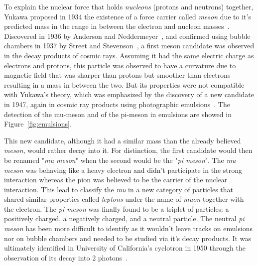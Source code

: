 	To explain the nuclear force that holds \textit{nucleons} (protons and neutrons) together, Yukawa proposed in 1934 the existence of a force carrier called \textit{meson} due to it's predicted mass in the range in between the electron and nucleon masses~\cite{YUKAWA1935}. Discovered in 1936 by Anderson and Neddermeyer~\cite{ANDERSON1936,NEDDERMEYER1937}, and confirmed using bubble chambers in 1937 by Street and Stevenson~\cite{STREET1937}, a first meson candidate was observed in the decay products of cosmic rays. Assuming it had the same electric charge as electrons and protons, this particle was observed to have a curvature due to magnetic field that was sharper than protons but smoother than electrons resulting in a mass in between the two. But its properties were not compatible with Yukawa's theory, which was emphasized by the discovery of a new candidate in 1947, again in cosmic ray products using photographic emulsions~\cite{LATTES1947I,LATTES1947II,LATTES1947III}. The detection of the mu-meson and of the pi-meson in emulsions are showed in Figure~\ref{fig:emulsions}.
	
	This new candidate, although it had a similar mass than the already believed \textit{meson}, would rather decay into it. For distinction, the first candidate would then be renamed "\textit{mu meson}" when the second would be the "\textit{pi meson}". The \textit{mu meson} was behaving like a heavy electron and didn't participate in the strong interaction whereas the pion was believed to be the carrier of the nuclear interaction. This lead to classify the \textit{mu} in a new category of particles  that shared similar properties called \textit{leptons} under the name of \textit{muon} together with the electron. The \textit{pi meson} was finally found to be a triplet of particles: a positively charged, a negatively charged, and a neutral particle. The neutral \textit{pi meson} has been more difficult to identify as it wouldn't leave tracks on emulsions nor on bubble chambers and needed to be studied via it's decay products. It was ultimately identified in University of California's cyclotron in 1950 through the observation of its decay into 2 photons~\cite{BJORKLUND1950}.
	
